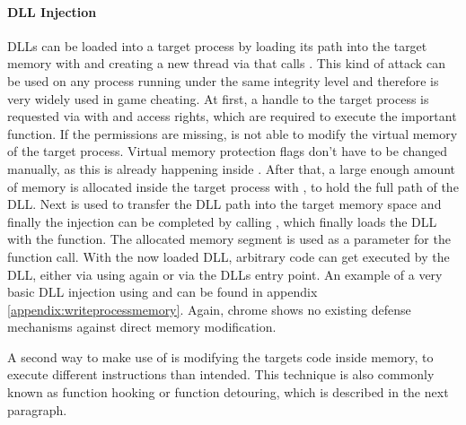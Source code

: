 \paragraph{ DLL Injection}
DLLs can be loaded into a target process by loading its path into the target memory with  and creating a new thread via  that calls . This kind of attack can be used on any process running under the same integrity level and therefore is very widely used in game cheating. At first, a handle to the target process is requested via  with  and  access rights, which are required to execute the important  function. If the permissions are missing,  is not able to modify the virtual memory of the target process. Virtual memory protection flags don't have to be changed manually, as this is already happening inside . After that, a large enough amount of memory is allocated inside the target process with , to hold the full path of the DLL. Next  is used to transfer the DLL path into the target memory space and finally the injection can be completed by calling , which finally loads the DLL with the  function. The allocated memory segment is used as a parameter for the  function call. With the now loaded DLL, arbitrary code can get executed by the DLL, either via using  again or via the DLLs entry point.
An example of a very basic DLL injection using  and  can be found in appendix \ref{appendix:writeprocessmemory}. Again, chrome shows no existing defense mechanisms against direct memory modification.

A second way to make use of  is modifying the targets code inside memory, to execute different instructions than intended. This technique is also commonly known as function hooking or function detouring, which is described in the next paragraph. 
